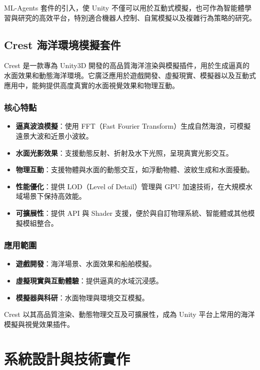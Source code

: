 \documentclass[12pt,a4paper]{ctexart}
\begin{document}
ML-Agents 套件的引入，使 Unity 不僅可以用於互動式模擬，也可作為智能體學習與研究的高效平台，特別適合機器人控制、自駕模擬以及複雜行為策略的研究。


\subsection{Crest 海洋環境模擬套件}
Crest 是一款專為 Unity3D 開發的高品質海洋渲染與模擬插件，用於生成逼真的水面效果和動態海洋環境。它廣泛應用於遊戲開發、虛擬現實、模擬器以及互動式應用中，能夠提供高度真實的水面視覺效果和物理互動。

\subsubsection{核心特點}
\begin{itemize}
    \item \textbf{逼真波浪模擬}：使用 FFT（Fast Fourier Transform）生成自然海浪，可模擬遠景大波和近景小波紋。
    \item \textbf{水面光影效果}：支援動態反射、折射及水下光照，呈現真實光影交互。
    \item \textbf{物理互動}：支援物體與水面的動態交互，如浮動物體、波紋生成和水面擾動。
    \item \textbf{性能優化}：提供 LOD（Level of Detail）管理與 GPU 加速技術，在大規模水域場景下保持高效能。
    \item \textbf{可擴展性}：提供 API 與 Shader 支援，便於與自訂物理系統、智能體或其他模擬模組整合。
\end{itemize}

\subsubsection{應用範圍}
\begin{itemize}
    \item \textbf{遊戲開發}：海洋場景、水面效果和船舶模擬。
    \item \textbf{虛擬現實與互動體驗}：提供逼真的水域沉浸感。
    \item \textbf{模擬器與科研}：水面物理與環境交互模擬。
\end{itemize}

Crest 以其高品質渲染、動態物理交互及可擴展性，成為 Unity 平台上常用的海洋模擬與視覺效果插件。


\section{系統設計與技術實作}
\end{document}
